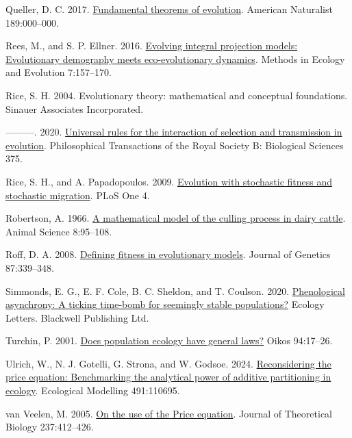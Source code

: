 \documentclass[
]{article}
\newlength{\cslhangindent}
\newenvironment{CSLReferences}[2] %
 {\begin{list}{}{%
  \setlength{\itemindent}{0pt}
  \setlength{\leftmargin}{0pt}
  \setlength{\parsep}{0pt}
  \ifodd #1
   \setlength{\leftmargin}{\cslhangindent}
   \setlength{\itemindent}{-1\cslhangindent}
  \fi
  \setlength{\itemsep}{#2\baselineskip}}}
 {\end{list}}
\begin{document}
\begin{CSLReferences}{0}{0}
Queller, D. C. 2017. \href{https://doi.org/10.1086/690937}{{Fundamental
theorems of evolution}}. American Naturalist 189:000--000.

Rees, M., and S. P. Ellner. 2016.
\href{https://doi.org/10.1111/2041-210X.12487}{Evolving integral
projection models: Evolutionary demography meets eco-evolutionary
dynamics}. Methods in Ecology and Evolution 7:157--170.

Rice, S. H. 2004. {Evolutionary theory: mathematical and conceptual
foundations}. Sinauer Associates Incorporated.

---------. 2020.
\href{https://doi.org/10.1098/rstb.2019.0353}{{Universal rules for the
interaction of selection and transmission in evolution}}. Philosophical
Transactions of the Royal Society B: Biological Sciences 375.

Rice, S. H., and A. Papadopoulos. 2009.
\href{https://doi.org/10.1371/journal.pone.0007130}{{Evolution with
stochastic fitness and stochastic migration}}. PLoS One 4.

Robertson, A. 1966. \href{https://doi.org/10.1017/S0003356100037752}{{A
mathematical model of the culling process in dairy cattle}}. Animal
Science 8:95--108.

Roff, D. A. 2008.
\href{https://doi.org/10.1007/s12041-008-0056-9}{{Defining fitness in
evolutionary models}}. Journal of Genetics 87:339--348.

Simmonds, E. G., E. F. Cole, B. C. Sheldon, and T. Coulson. 2020.
\href{https://doi.org/10.1111/ele.13603}{Phenological asynchrony: A
ticking time-bomb for seemingly stable populations?} Ecology Letters.
Blackwell Publishing Ltd.

Turchin, P. 2001.
\href{https://doi.org/10.1034/j.1600-0706.2001.11310.x}{Does population
ecology have general laws?} Oikos 94:17--26.

Ulrich, W., N. J. Gotelli, G. Strona, and W. Godsoe. 2024.
\href{https://doi.org/10.1016/j.ecolmodel.2024.110695}{Reconsidering the
price equation: Benchmarking the analytical power of additive
partitioning in ecology}. Ecological Modelling 491:110695.

van Veelen, M. 2005.
\href{https://doi.org/10.1016/j.jtbi.2005.04.026}{{On the use of the
Price equation}}. Journal of Theoretical Biology 237:412--426.


\end{CSLReferences}
\end{document}
